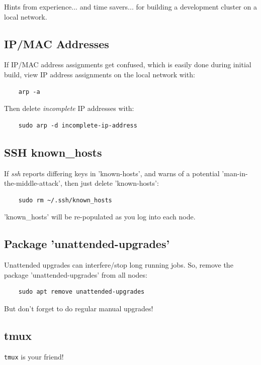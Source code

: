 \documentclass{article}
\begin{document}
Hints from experience... and time savers... for building a development cluster on a local network.

\subsection{IP/MAC Addresses}
If IP/MAC address assignments get confused, which is easily done during initial build, view IP address assignments on the local network with:

\begin{verbatim}
    arp -a
\end{verbatim}

Then delete \emph{incomplete} IP addresses with:

\begin{verbatim}
    sudo arp -d incomplete-ip-address
\end{verbatim}

\subsection{SSH known\_hosts}
If \emph{ssh} reports differing keys in 'known-hosts', and warns of a potential 'man-in-the-middle-attack', then just delete 'known-hosts':

\begin{verbatim}
    sudo rm ~/.ssh/known_hosts
\end{verbatim}

'known\_hosts' will be re-populated as you log into each node. 

\subsection{Package 'unattended-upgrades'}

Unattended upgrades can interfere/stop long running jobs. So, remove the package 'unattended-upgrades' from all nodes:

\begin{verbatim}
    sudo apt remove unattended-upgrades
\end{verbatim}

But don't forget to do regular manual upgrades!

\subsection{tmux}
\verb|tmux| is your friend!
\end{document}
